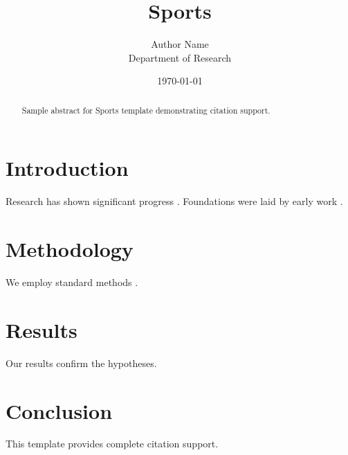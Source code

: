 \documentclass{mdpi}
\title{Sports}
\author{Author Name \\ \small Department of Research}
\date{\today}
\begin{document}
\maketitle

\begin{abstract}
Sample abstract for Sports template demonstrating citation support.
\end{abstract}

\section{Introduction}
Research has shown significant progress \citep{einstein1905}. Foundations were laid by early work \citep{turing1950}.

\section{Methodology}
We employ standard methods \citep{knuth1984}.

\section{Results}
Our results confirm the hypotheses.

\section{Conclusion}
This template provides complete citation support.



\end{document}
